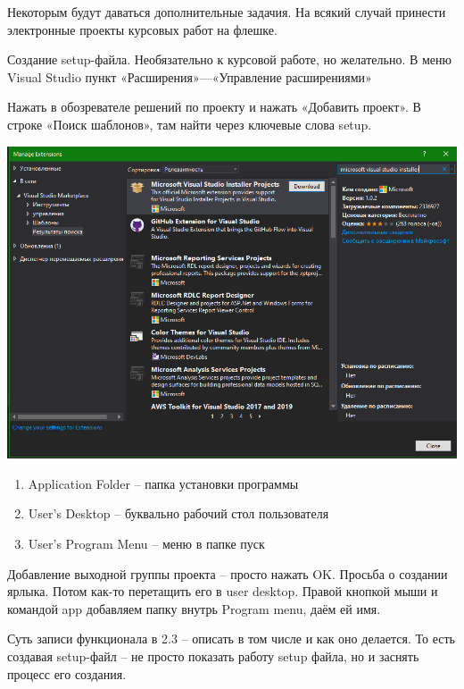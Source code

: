 \documentclass{article}
\begin{document}
Некоторым будут даваться дополнительные задачия. На всякий случай принести электронные проекты курсовых работ на флешке.

\hfill

Создание setup-файла. Необязательно к курсовой работе, но желательно. В меню Visual Studio пункт «Расширения»—«Управление расширениями»

Нажать в обозревателе решений по проекту и нажать «Добавить проект». В строке «Поиск шаблонов», там найти через ключевые слова setup.

\begin{center}
    \includegraphics[width=\textwidth]{images/image_06.png}
\end{center}

\begin{enumerate}
    \item Application Folder – папка установки программы
    \item User’s Desktop – буквально рабочий стол пользователя
    \item User’s Program Menu – меню в папке пуск
\end{enumerate}

Добавление выходной группы проекта – просто нажать OK. Просьба о создании ярлыка. Потом как-то перетащить его в user desktop. Правой кнопкой мыши и командой app добавляем папку внутрь Program menu, даём ей имя.

Суть записи функционала в 2.3 – описать в том числе и как оно делается. То есть создавая setup-файл – не просто показать работу setup файла, но и заснять процесс его создания.
    
\end{document}
